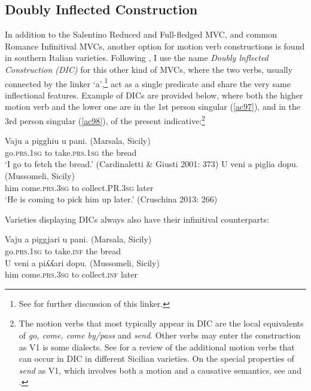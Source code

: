 \documentclass[output=paper]{langscibook}
\begin{document}
\subsection{Doubly Inflected Construction}

In addition to the Salentino Reduced and Full-fledged MVC, and common Romance Infinitival MVCs, another option for motion verb constructions is found in southern Italian varieties. Following \citet{cruschina2013a}, I use the name \textit{Doubly lnflected Construction (DIC)} for this other kind of MVCs, where the two verbs, usually connected by the linker ‘a’,\footnote{See \citet{calabrese2021a} for further discussion of this linker.}  act as a single predicate and share the very same inflectional features. Example of DICs are provided below, where both the higher motion verb and the lower one are in the 1st person singular (\ref{ac97}), and in the 3rd person singular (\ref{ac98}), of the present indicative:\footnote{The motion verbs that most typically appear in DIC are the local equivalents of \textit{go, come, come by\slash pass} and \textit{send}. Other verbs may enter the construction as V1 is some dialects. See \citet{caro2018a, caro2019a} for a review of the additional motion verbs that can occur in DIC in different Sicilian varieties. On the special properties of \textit{send} as V1, which involves both a motion and a causative semantics, see \citet{todaro2018a} and \citet{prete2020a}.}

\ea \label{ac97}
\gll Vaju    a   pigghiu    u   pani.    (Marsala, Sicily)\\
   go.\textsc{prs}.\textsc{1sg} to   take.\textsc{prs}.\textsc{1sg}  the  bread \\
 \glt  ‘I go to fetch the bread.’ \hfill (Cardinaletti \& Giusti 2001: 373)
\ex \label{ac98}
\gll  U   veni      a  piglia   dopu.      (Mussomeli, Sicily)\\
   him  come.\textsc{prs}.\textsc{3sg}  to  collect.PR.\textsc{3sg} later\\
\glt   ‘He is coming to pick him up later.’ \hfill  (Cruschina 2013: 266)
\z

Varieties displaying DICs always also have their infinitival counterparts:

\ea \label{ac99}\gll Vaju    a  piggjari u     pani.    (Marsala, Sicily)\\
go.\textsc{prs}.\textsc{1sg} to  take.\textsc{inf} the    bread \\
\ex \label{ac100}\gll U   veni      a   piʎʎari   dopu.   (Mussomeli, Sicily)\\
him  come.\textsc{prs}.\textsc{3sg} to   collect.\textsc{inf} later\\
\z
\end{document}
